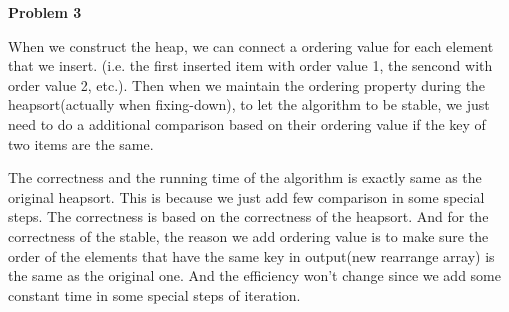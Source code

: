 \documentclass[12pt]{article}
\begin{document}
	
	\begin{center}
		{\Large\bf Problem 3}\\
		\vspace{3mm}
	\end{center}
	
	\def\question#1{\item[\bf #1.]}
	\def\part#1{\item[\bf #1)]}
	\newcommand{\pc}[1]{\mbox{\textbf{#1}}} %
	
	
	
	When we construct the heap, we can connect a ordering value for each element that we insert. (i.e. the first inserted item with order value 1, the sencond with order value 2, etc.). Then when we maintain the ordering property during the heapsort(actually when fixing-down), to let the algorithm to be stable, we just need to do a additional comparison based on their ordering value if the key of two items are the same.
	
	The correctness and the running time of the algorithm is exactly same as the original heapsort. This is because we just add few comparison in some special steps. The correctness is based on the correctness of the heapsort. And for the correctness of the stable, the reason we add ordering value is to make sure the order of the elements that have the same key in output(new rearrange array) is the same as the original one. And the efficiency won't change since we add some constant time in some special steps of iteration.
	
	
\end{document}
